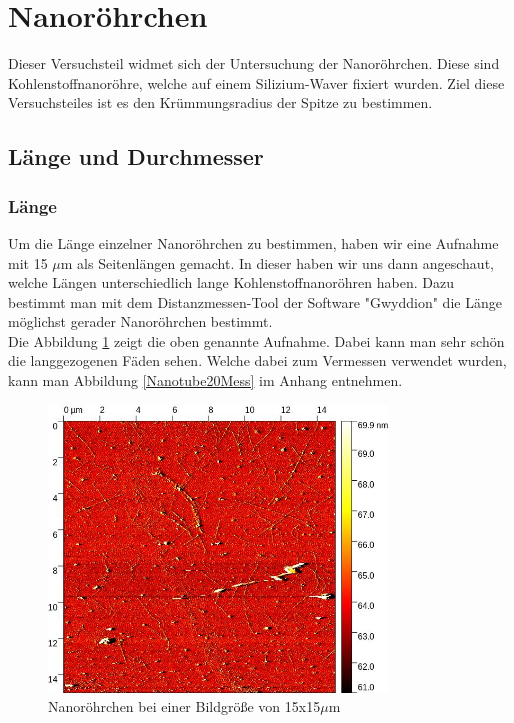 

\section{Nanoröhrchen}
Dieser Versuchsteil widmet sich der Untersuchung der Nanoröhrchen. Diese sind Kohlenstoffnanoröhre, welche auf einem Silizium-Waver 
fixiert wurden. Ziel diese Versuchsteiles ist es den Krümmungsradius der Spitze zu bestimmen.
\subsection{Länge und Durchmesser}
\subsubsection*{Länge}
Um die Länge einzelner Nanoröhrchen zu bestimmen, haben wir eine Aufnahme mit 15 $\mu$m als Seitenlängen gemacht. In dieser haben wir uns 
dann angeschaut, welche Längen unterschiedlich lange Kohlenstoffnanoröhren haben. Dazu bestimmt man mit dem Distanzmessen-Tool der Software 
"Gwyddion" die Länge möglichst gerader Nanoröhrchen bestimmt. \\
Die Abbildung \ref{Nanotube20} zeigt die oben genannte Aufnahme. Dabei kann man sehr schön die langgezogenen Fäden sehen. Welche dabei zum Vermessen verwendet wurden, 
kann man Abbildung \ref{Nanotube20Mess} im Anhang entnehmen.

\begin{figure}[h]
    \centering
    \includegraphics[width = 9cm]{Bilder/Nanotubes/NanoTube15um.jpg}
    \caption{Nanoröhrchen bei einer Bildgröße von 15x15$\mu$m}
    \label{Nanotube20}
\end{figure}

